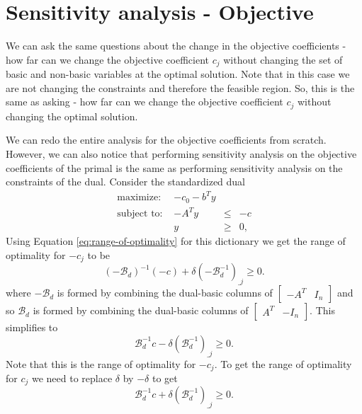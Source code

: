 \documentclass[
]{book}
\theoremstyle{definition}
\theoremstyle{definition}
\theoremstyle{definition}
\theoremstyle{definition}
\theoremstyle{remark}
\begin{document}
\hypertarget{sensitivity-analysis---objective}{%
\section{Sensitivity analysis - Objective}\label{sensitivity-analysis---objective}}

We can ask the same questions about the change in the objective coefficients - how far can we change the objective coefficient \(c_j\) without changing the set of basic and non-basic variables at the optimal solution. Note that in this case we are not changing the constraints and therefore the feasible region. So, this is the same as asking - how far can we change the objective coefficient \(c_j\) without changing the optimal solution.

We can redo the entire analysis for the objective coefficients from scratch. However, we can also notice that performing sensitivity analysis on the objective coefficients of the primal is the same as performing sensitivity analysis on the constraints of the dual.
Consider the standardized dual
\begin{equation*}
  \begin{array}{lrll}
    \mbox{maximize: } & -c_0 -b^T y \\
    \mbox{subject to: } 
      & -A^T y & \leq & -c \\
      & y & \geq & 0,
  \end{array}
\end{equation*}
Using Equation \eqref{eq:range-of-optimality} for this dictionary we get the range of optimality for \(-c_j\) to be
\begin{equation}
  (-\mathcal{B}_d)^{-1} (-c) + \delta (-\mathcal{B}_d^{-1})_{\_j} \ge 0.
\end{equation}
where \(-\mathcal{B}_d\) is formed by combining the dual-basic columns of \(\begin{bmatrix} -A^T & I_n\end{bmatrix}\) and so \(\mathcal{B}_d\) is formed by combining the dual-basic columns of \(\begin{bmatrix} A^T & -I_n\end{bmatrix}\). This simplifies to
\begin{equation}
  \mathcal{B}_d^{-1} c - \delta (\mathcal{B}_d^{-1})_{\_j} \ge 0.
\end{equation}
Note that this is the range of optimality for \(-c_j\). To get the range of optimality for \(c_j\) we need to replace \(\delta\) by \(-\delta\) to get
\begin{equation}
  \mathcal{B}_d^{-1} c + \delta (\mathcal{B}_d^{-1})_{\_j} \ge 0.
\end{equation}
\end{document}
